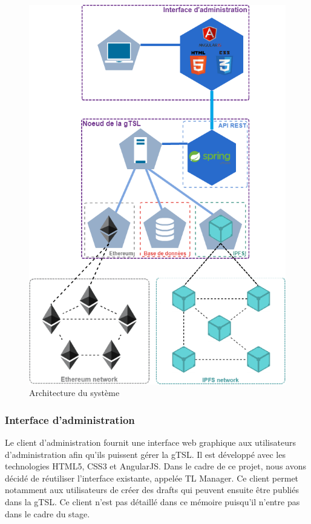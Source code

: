 \documentclass{tnreport}
\begin{document}
\begin{figure}[h]
	\centering
	\includegraphics[scale=0.42]{figures/architecture}
	\caption{Architecture du système}
	\label{fig:architecture-node}
\end{figure}

\subsubsection{Interface d'administration}

Le client d'administration fournit une interface web graphique aux utilisateurs d'administration afin qu'ils puissent gérer la gTSL. Il est développé avec les technologies HTML5, CSS3 et AngularJS. Dans le cadre de ce projet, nous avons décidé de réutiliser l'interface existante, appelée TL Manager. Ce client permet notamment aux utilisateurs de créer des drafts qui peuvent ensuite être publiés dans la gTSL. Ce client n'est pas détaillé dans ce mémoire puisqu'il n'entre pas dans le cadre du stage.
\end{document}
